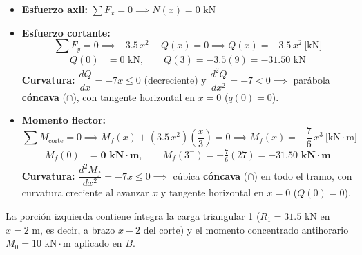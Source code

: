 \begin{itemize}
    \item \textbf{Esfuerzo axil:} $\sum F_x = 0 \implies \boxed{N(x) = 0\text{ kN}}$
    \item \textbf{Esfuerzo cortante:}
          \begin{equation}
              \sum F_y = 0 \implies -3.5\,x^2 - Q(x) = 0 \implies \boxed{Q(x) = -3.5\,x^2 \ \text{[kN]}}
          \end{equation}
          \begin{align*}
              Q(0) & = 0\text{ kN}, \qquad Q(3) = -3.5(9) = -31.50\text{ kN}
          \end{align*}
          \textbf{Curvatura:} $\dfrac{dQ}{dx} = -7x \le 0$ (decreciente) y $\dfrac{d^2Q}{dx^2} = -7 < 0 \implies$ parábola \textbf{cóncava} ($\cap$), con tangente horizontal en $x = 0$ ($q(0)=0$).
    \item \textbf{Momento flector:}
          \begin{equation}
              \sum M_{\text{corte}} = 0 \implies M_f(x) + (3.5\,x^2)\left(\frac{x}{3}\right) = 0 \implies \boxed{M_f(x) = -\frac{7}{6}\,x^3 \ \text{[kN}\cdot\text{m]}}
          \end{equation}
          \begin{align*}
              M_f(0) & = \mathbf{0\text{ kN}\cdot\text{m}}, \qquad M_f(3^-) = -\frac{7}{6}(27) = \mathbf{-31.50\text{ kN}\cdot\text{m}}
          \end{align*}
          \textbf{Curvatura:} $\dfrac{d^2M_f}{dx^2} = -7x \le 0 \implies$ cúbica \textbf{cóncava} ($\cap$) en todo el tramo, con curvatura creciente al avanzar $x$ y tangente horizontal en $x = 0$ ($Q(0)=0$).
\end{itemize}


La porción izquierda contiene íntegra la carga triangular 1 ($R_1 = 31.5\text{ kN}$ en $x = 2\text{ m}$, es decir, a brazo $x-2$ del corte) y el momento concentrado antihorario $M_0 = 10\text{ kN}\cdot\text{m}$ aplicado en $B$.

